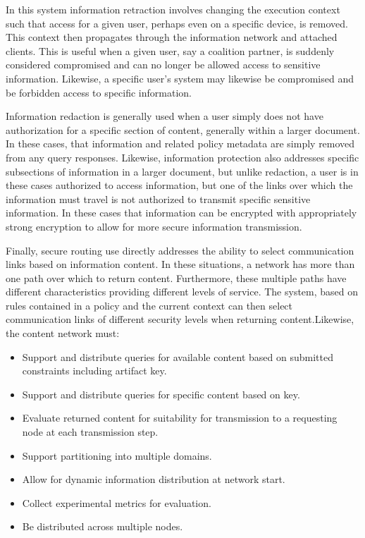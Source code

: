 In this system information retraction involves changing the execution context such that access for a given user, perhaps even on a specific device, is removed.  This context then propagates through the information network and attached clients.  This is useful when a given user, say a coalition partner, is suddenly considered compromised and can no longer be allowed access to sensitive information.  Likewise, a specific user's system may likewise be compromised and be forbidden access to specific information.

Information redaction is generally used when a user simply does not have authorization for a specific section of content, generally within a larger document. In these cases, that information and related policy metadata are simply removed from any query responses.  Likewise, information protection also addresses specific subsections of information in a larger document, but unlike redaction, a user is in these cases authorized to access information, but one of the links over which the information must travel is not authorized to transmit specific sensitive information.  In these cases that information can be encrypted with appropriately strong encryption to allow for more secure information transmission.

Finally, secure routing use directly addresses the ability to select communication links based on information content.  In these situations, a network has more than one path over which to return content.  Furthermore, these multiple paths have different characteristics providing different levels of service.  The system, based on rules contained in a policy and the current context can then select communication links of different security levels when returning content.Likewise, the content network must:

\begin{itemize}
\item Support and distribute queries for available content based on submitted constraints including artifact key.
\item Support and distribute queries for specific content based on key.
\item Evaluate returned content for suitability for transmission to a requesting node at each transmission step.
\item Support partitioning into multiple domains.
\item Allow for dynamic information distribution at network start.
\item Collect experimental metrics for evaluation.
\item Be distributed across multiple nodes.
\end{itemize}

